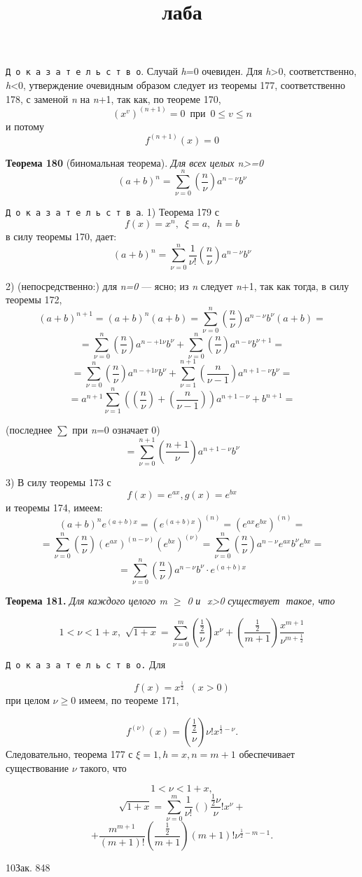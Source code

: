 \documentclass{book}
\title{лаба}
\begin{document}
\texttt{Д\,о\,к\,а\,з\,а\,т\,е\,л\,ь\,с\,т\,в\,о}. Случай \textit{h}=0 очевиден. Для \textsl{h}>0, соответственно, \textit{h}<0, утверждение очевидным образом следует из теоремы 177, соответственно 178, с заменой \textit{n} на \textit{n}+1, так как, по теореме 170, 
\[
(x^\mathit{v})^{(n+1)}=0\,\,\,при\,\,\,0\leqslant \mathit{v} \leqslant n
\]
и потому
\[
\mathit{f}^{(n+1)}(x)=0
\]

\textbf{Теорема 180} (биномальная теорема). \textit{Для всех целых n>=0}
\[
(a+b)^n=\sum\limits^{n}_{\nu=0} {(\frac{n}{\nu})a^{n-\nu}b^\nu}
\]

\texttt{Д\,о\,к\,а\,з\,а\,т\,е\,л\,ь\,с\,т\,в\,а}. 1) Теорема 179 с
\[
\mathit{f}(x)=x^n,\,\,\,\xi=a,\,\,\,h=b
\]
в силу теоремы 170, дает:
\[
(a+b)^n=\sum\limits^{n}_{\nu=0} {\frac{1}{\nu!}(\frac{n}{\nu})a^{n-\nu}b^\nu}
\]

2) (непосредственно:) для \textit{n=0} --- ясно;  из \textit{n} следует \textit{n}+1, так как тогда, в силу теоремы 172,
\[
(a+b)^{n+1}=(a+b)^n(a+b)=\sum\limits^{n}_{\nu=0} {(\frac{n}{\nu})a^{n-\nu}b^\nu}(a+b)=
\]\[=\sum\limits^{n}_{\nu=0} {(\frac{n}{\nu})a^{n-+1\nu}b^\nu}+\sum\limits^{n}_{\nu=0} {(\frac{n}{\nu})a^{n-\nu}b^{\nu+1}}=
\]\[=\sum\limits^{n}_{\nu=0} {(\frac{n}{\nu})a^{n-+1\nu}b^\nu}+\sum\limits^{n+1}_{\nu=1} {(\frac{n}{\nu-1})a^{n+1-\nu}b^{\nu}}=
\]\[=a^{n+1}\sum\limits^{n}_{\nu=1}{((\frac{n}{\nu})+(\frac{n}{\nu-1}))a^{n+1-\nu}+b^{n+1}}=
\]
\newpage

\fancyhead[L]{}                 %
\fancyhead[R]{\textsl{\thepage}}
(последнее \(\sum\) при \textit{n}=0 означает 0)
\[
= \sum\limits^{n+1}_{\nu=0}(\frac{n+1}{\nu})a^{n+1-\nu}b^\nu
\]

3) В силу теоремы 173 с 
\[
\mathit{f}(x)=e^{ax}, {g}(x)=e^{bx}
\]
и теоремы 174, имеем:
\[
(a+b)^ne^{(a+b)x}=(e^{(a+b)x})^{(n)}=(e^{ax}e^{bx})^{(n)}=
\]
\[
=\sum\limits^n_{\nu=0}(\frac{n}{\nu})(e^{ax})^{(n-\nu)}(e^{bx})^{(\nu)}=\sum\limits^n_{\nu=0}(\frac{n}{\nu})a^{n-\nu}e^{ax}b^\nu e^{bx}=
\]
\[
=\sum\limits^n_{\nu=0}(\frac{n}{\nu})a^{n-\nu}b^\nu \cdot e^{(a+b)x}
\]

\textbf{Теорема 181.} \textit{Для каждого целого m $\geqslant$ 0\,\,и\,\, x>0\,\,существует\,\,\nu\,\,такое, что}

\[
1<\nu<1+x,\,\,\sqrt{1+x}=\sum\limits^m_{\nu=0}(\frac{\frac{1}{2}}{\nu})x^\nu+(\frac{\frac{1}{2}}{m+1})\frac{x^{m+1}}{\nu^{m+\frac{1}{2}}}
\]

\texttt{Д\,о\,к\,а\,з\,а\,т\,е\,л\,ь\,с\,т\,в\,о.} Для

\[
\mathit{f}(x)=x^\frac{1}{2}\,\,\,(x>0)
\]
при целом $\nu\geqslant$0 имеем, по теореме 171, 

\[
\mathit{f}^{(\nu)}(x)=(\frac{\frac{1}{2}}{\nu})\nu!x^{\frac{1}{2}-\nu}.
\]
Следовательно, теорема 177 с $\xi=1, h=x, n=m+1$ обеспечивает существование $\nu$ такого, что

\[
1<\nu<1+x,
\]
\[
\sqrt{1+x}=\sum\limits^m_{\nu=0} \frac{1}{\nu!}()\frac{\frac{1}{2}{\nu}}\nu!x^\nu+
\]
\[
+\frac{m^{m+1}}{(m+1)!}(\frac{\frac{1}{2}}{m+1})(m+1)!\nu^{\frac{1}{2}-m-1}.
\]

10\scriptsize{Зак. 848}
\end{document}
